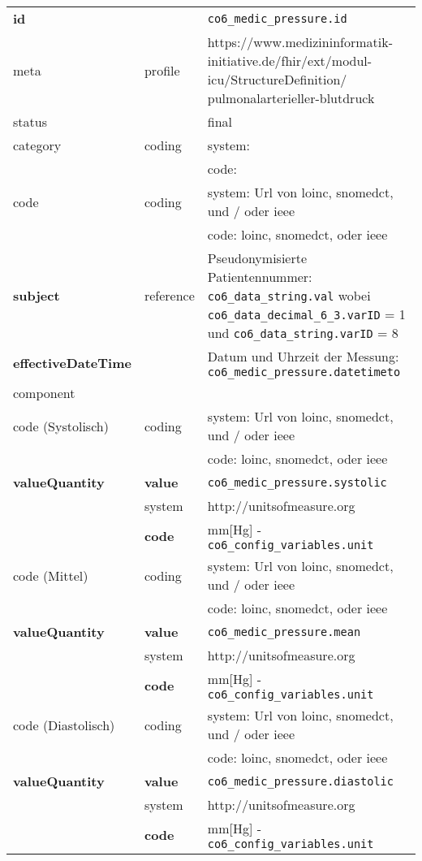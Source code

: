 \begin{longtable}{|l|l|p{7.5cm}|}
        \hline
        \rowcolor{lightgray} \multicolumn{3}{|l|}{Data Mapping (inhaltlich)} \\ \hline
        \textbf{id} &  & \texttt{co6\_medic\_pressure.id} \\ \hline
	meta & profile & https://www.medizininformatik-initiative.de/fhir/ext/modul-icu/StructureDefinition/
	pulmonalarterieller-blutdruck \\ \hline 
	status & & final  \\ \hline 
	category & coding & system:  \\ 
\cline{3-3}
        & & code:  \\ \hline
        code & coding & system: Url von \ac{loinc}, \ac{snomedct}, und / oder \ac{ieee} \\
        \cline{3-3}
         & & code: \ac{loinc}, \ac{snomedct}, oder \ac{ieee} \\ \hline
        \textbf{subject} & reference & Pseudonymisierte Patientennummer: \texttt{co6\_data\_string.val} wobei \texttt{co6\_data\_decimal\_6\_3.varID} = 1 und \texttt{co6\_data\_string.varID} = 8 \\ \hline
        \textbf{effectiveDateTime} & & Datum und Uhrzeit der Messung:  \texttt{co6\_medic\_pressure.datetimeto} \\ \hline
	\multicolumn{3}{|l|}{component} \\ \hline
	code (Systolisch)  & coding & system: Url von \ac{loinc}, \ac{snomedct}, und / oder \ac{ieee} \\ 
	\cline{3-3} 
	&  & code: \ac{loinc}, \ac{snomedct}, oder \ac{ieee} \\ \hline	
	\textbf{valueQuantity} & \textbf{value} & \texttt{co6\_medic\_pressure.systolic} \\
	\cline{2-3}
	& system & http://unitsofmeasure.org \\ 
	\cline{2-3}
	& \textbf{code} & mm[Hg] - \texttt{co6\_config\_variables.unit} \\ \hline
	code (Mittel)  & coding & system: Url von \ac{loinc}, \ac{snomedct}, und / oder \ac{ieee} \\ 
	\cline{3-3} 
	&  & code: \ac{loinc}, \ac{snomedct}, oder \ac{ieee} \\ \hline	
	\textbf{valueQuantity} & \textbf{value} & \texttt{co6\_medic\_pressure.mean} \\
	\cline{2-3}
	& system & http://unitsofmeasure.org \\ 
	\cline{2-3}
	& \textbf{code} &  mm[Hg] - \texttt{co6\_config\_variables.unit} \\ \hline
	code (Diastolisch)  & coding & system: Url von \ac{loinc}, \ac{snomedct}, und / oder \ac{ieee} \\ 
	\cline{3-3} 
	&  & code: \ac{loinc}, \ac{snomedct}, oder \ac{ieee} \\ \hline	
	\textbf{valueQuantity} & \textbf{value} & \texttt{co6\_medic\_pressure.diastolic} \\
	\cline{2-3}
	& system & http://unitsofmeasure.org \\ 
	\cline{2-3}
	& \textbf{code} & mm[Hg] - \texttt{co6\_config\_variables.unit} \\ \hline
\end{longtable}
